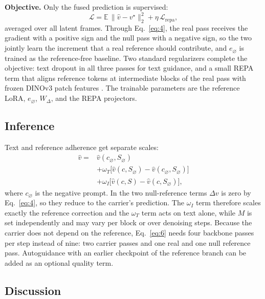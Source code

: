\textbf{Objective.} Only the fused prediction is supervised:
\begin{equation}\label{eq:5}
\mathcal{L} = \mathbb{E}\,\big\lVert \hat v - v^{\star} \big\rVert_2^2 + \eta\,\mathcal{L}_{\mathrm{repa}},
\end{equation}
averaged over all latent frames. Through Eq.~\eqref{eq:4}, the real pass receives the gradient with a positive sign and the null pass with a negative sign, so the two jointly learn the increment that a real reference should contribute, and $e_\varnothing$ is trained as the reference-free baseline. Two standard regularizers complete the objective: text dropout in all three passes for text guidance, and a small REPA term \cite{yu2024repa} that aligns reference tokens at intermediate blocks of the real pass with frozen DINOv3 patch features \cite{simeoni2025dinov3}. The trainable parameters are the reference LoRA, $e_\varnothing$, $W_\Delta$, and the REPA projectors.

\subsection{Inference}
\label{sec:3_6}

Text and reference adherence get separate scales:
\begin{equation}\label{eq:6}
\begin{aligned}
\hat v ={}& \hat v(c_\varnothing, S_\varnothing)\\
&+ \omega_T\big[\hat v(c, S_\varnothing) - \hat v(c_\varnothing, S_\varnothing)\big]\\
&+ \omega_I\big[\hat v(c, S) - \hat v(c, S_\varnothing)\big],
\end{aligned}
\end{equation}
where $c_\varnothing$ is the negative prompt. In the two null-reference terms $\Delta v$ is zero by Eq.~\eqref{eq:4}, so they reduce to the carrier's prediction. The $\omega_I$ term therefore scales exactly the reference correction and the $\omega_T$ term acts on text alone, while $M$ is set independently and may vary per block or over denoising steps. Because the carrier does not depend on the reference, Eq.~\eqref{eq:6} needs four backbone passes per step instead of nine: two carrier passes and one real and one null reference pass. Autoguidance \cite{karras2024autoguidance} with an earlier checkpoint of the reference branch can be added as an optional quality term.

\subsection{Discussion}
\label{sec:3_7}

